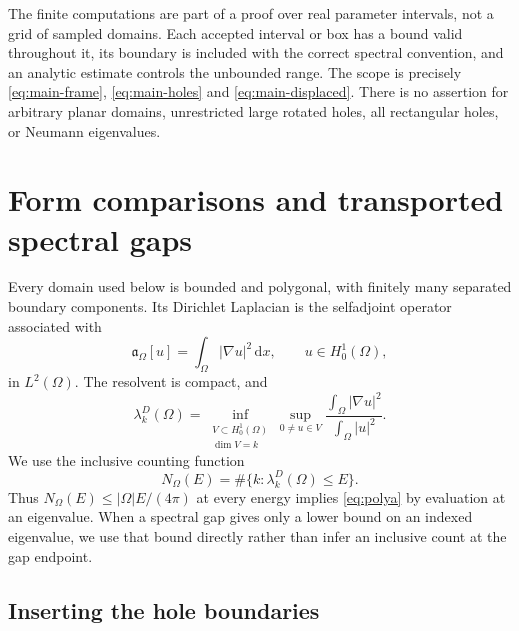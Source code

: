 \documentclass[11pt,reqno]{amsart}
\numberwithin{equation}{section}
\newcommand{\dd}{\,\mathrm d}
\newcommand{\Om}{\Omega}
\begin{document}
The finite computations are part of a proof over real parameter
intervals, not a grid of sampled domains. Each accepted interval
or box has a bound valid throughout it, its boundary is included
with the correct spectral convention, and an analytic estimate
controls the unbounded range. The scope is precisely
\eqref{eq:main-frame}, \eqref{eq:main-holes} and
\eqref{eq:main-displaced}. There is no assertion for arbitrary
planar domains, unrestricted large rotated holes, all rectangular
holes, or Neumann eigenvalues.

\section{Form comparisons and transported spectral gaps}\label{sec:comparison}

Every domain used below is bounded and polygonal, with finitely
many separated boundary components. Its Dirichlet Laplacian is
the selfadjoint operator associated with
\[
 \mathfrak a_\Om[u]=\int_\Om|\nabla u|^2\dd x,
 \qquad u\in H^1_0(\Om),
\]
in $L^2(\Om)$. The resolvent is compact, and
\begin{equation}\label{eq:minmax}
 \lambda_k^D(\Om)=
 \inf_{\substack{V\subset H^1_0(\Om)\\\dim V=k}}
 \sup_{0\ne u\in V}
 \frac{\int_\Om|\nabla u|^2}{\int_\Om|u|^2}.
\end{equation}
We use the inclusive counting function
\begin{equation}\label{eq:inclusive}
 N_\Om(E)=\#\{k:\lambda_k^D(\Om)\le E\}.
\end{equation}
Thus $N_\Om(E)\le|\Om|E/(4\pi)$ at every energy implies
\eqref{eq:polya} by evaluation at an eigenvalue. When a spectral
gap gives only a lower bound on an indexed eigenvalue, we use
that bound directly rather than infer an inclusive count at the
gap endpoint.

\subsection*{Inserting the hole boundaries}
\end{document}
